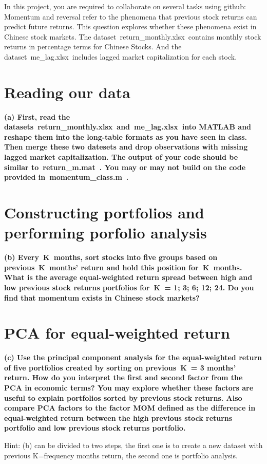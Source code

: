 \documentclass{article}
\begin{document}
In this project, you are required to collaborate on several tasks using github: Momentum and reversal refer to the phenomena that previous stock returns can predict future returns. This question explores whether these phenomena exist in Chinese stock markets. The dataset return_monthly.xlsx contains monthly stock returns in percentage terms for Chinese Stocks. And the dataset me_lag.xlsx includes lagged market capitalization for each stock.

\section{Reading our data}
\textbf{(a) First, read the datasets return_monthly.xlsx and me_lag.xlsx into MATLAB and reshape them into the long-table formats as you have seen in class. Then merge these two datesets and drop observations with missing lagged market capitalization. The output of your code should be similar to return_m.mat . You may or may not build on the code provided in momentum_class.m .}

\section{Constructing portfolios and performing porfolio analysis}
\textbf{(b) Every K months, sort stocks into five groups based on previous K months' return and hold this position for K months. What is the average equal-weighted return spread between high and low previous stock returns portfolios for K = 1; 3; 6; 12; 24. Do you find that momentum exists in Chinese stock markets?}


\section{PCA for equal-weighted return}
\textbf{(c) Use the principal component analysis for the equal-weighted return of five portfolios created by sorting on previous K = 3 months' return. How do you interpret the first and second factor from the PCA in economic terms? You may explore whether these factors are useful to explain portfolios sorted by previous stock returns. Also compare PCA factors to the factor MOM defined as the difference in equal-weighted return between the high previous stock returns portfolio and low previous stock returns portfolio.}

Hint: (b) can be divided to two steps, the first one is to create a new dataset with previous K=frequency months return, the second one is portfolio analysis.
\end{document}
